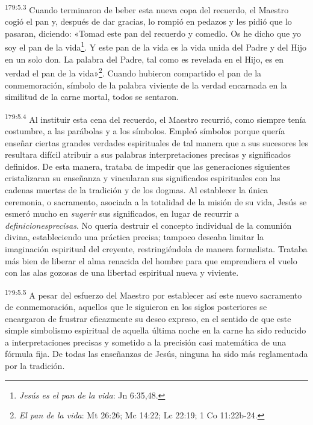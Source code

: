 \par 
\textsuperscript{179:5.3} Cuando terminaron de beber esta nueva copa del recuerdo, el Maestro cogió el pan y, después de dar gracias, lo rompió en pedazos y les pidió que lo pasaran, diciendo: «Tomad este pan del recuerdo y comedlo. Os he dicho que yo soy el pan de la vida\footnote{\textit{Jesús es el pan de la vida}: Jn 6:35,48.}. Y este pan de la vida es la vida unida del Padre y del Hijo en un solo don. La palabra del Padre, tal como es revelada en el Hijo, es en verdad el pan de la vida»\footnote{\textit{El pan de la vida}: Mt 26:26; Mc 14:22; Lc 22:19; 1 Co 11:22b-24.}. Cuando hubieron compartido el pan de la conmemoración, símbolo de la palabra viviente de la verdad encarnada en la similitud de la carne mortal, todos se sentaron.

\par 
\textsuperscript{179:5.4} Al instituir esta cena del recuerdo, el Maestro recurrió, como siempre tenía costumbre, a las parábolas y a los símbolos. Empleó símbolos porque quería enseñar ciertas grandes verdades espirituales de tal manera que a sus sucesores les resultara difícil atribuir a sus palabras interpretaciones precisas y significados definidos. De esta manera, trataba de impedir que las generaciones siguientes cristalizaran su enseñanza y vincularan sus significados espirituales con las cadenas muertas de la tradición y de los dogmas. Al establecer la única ceremonia, o sacramento, asociada a la totalidad de la misión de su vida, Jesús se esmeró mucho en \textit{sugerir} sus significados, en lugar de recurrir a \textit{definicionesprecisas}. No quería destruir el concepto individual de la comunión divina, estableciendo una práctica precisa; tampoco deseaba limitar la imaginación espiritual del creyente, restringiéndola de manera formalista. Trataba más bien de liberar el alma renacida del hombre para que emprendiera el vuelo con las alas gozosas de una libertad espiritual nueva y viviente.

\par 
\textsuperscript{179:5.5} A pesar del esfuerzo del Maestro por establecer así este nuevo sacramento de conmemoración, aquellos que le siguieron en los siglos posteriores se encargaron de frustrar eficazmente su deseo expreso, en el sentido de que este simple simbolismo espiritual de aquella última noche en la carne ha sido reducido a interpretaciones precisas y sometido a la precisión casi matemática de una fórmula fija. De todas las enseñanzas de Jesús, ninguna ha sido más reglamentada por la tradición.

